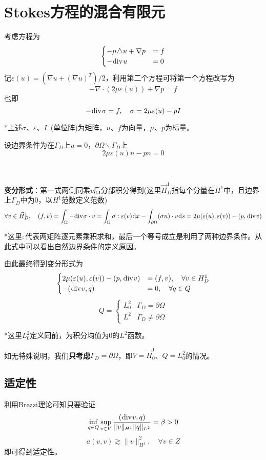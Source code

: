 \documentclass[a4paper,UTF8,fontset=windows]{ctexart}
\newcommand*{\dr}{\hspace{0.07em}\mathrm{d}}
\renewcommand*{\div}{\hspace{0.07em}\mathrm{div}\hspace{0.07em}}
\begin{document}
\section{Stokes方程的混合有限元}
考虑方程为
$$\begin{cases}-\mu\triangle u+\nabla p&=f\\-\div u&=0\end{cases}$$
记$\varepsilon(u)=(\nabla u+(\nabla u)^T)/2$，利用第二个方程可将第一个方程改写为
$$-\nabla\cdot(2\mu\varepsilon(u))+\nabla p=f$$
也即
$$-\div\sigma=f,\quad\sigma=2\mu\varepsilon(u)-pI$$

*上述$\sigma$、$\varepsilon$、$I$\ (单位阵)为矩阵，$u$、$f$为向量，$\mu$、$p$为标量。

设边界条件为在$\Gamma_D$上$u=0$，$\partial\Omega\backslash\Gamma_D$上
$$2\mu\varepsilon(u)n-pn=0$$

\

\textbf{变分形式}：第一式两侧同乘$v$后分部积分得到(这里$\vec{H}_D^1$指每个分量在$H^1$中，且边界上$\Gamma_D$中为0，以$H^1$范数定义范数)
$$\forall v\in\vec{H}_D^1,\quad(f,v)=\int_\Omega-\div\sigma\cdot v=\int_\Omega\sigma:\varepsilon(v)\dr x-\int_{\partial\Omega}(\sigma n)\cdot v\dr s=2\mu(\varepsilon(u),\varepsilon(v))-(p,\div v)$$

*这里$:$代表两矩阵逐元素乘积求和，最后一个等号成立是利用了两种边界条件。从此式中可以看出自然边界条件的定义原因。

由此最终得到变分形式为
$$\begin{cases}2\mu(\varepsilon(u),\varepsilon(v))-(p,\div v)&=(f,v),\quad\forall v\in H_D^1\\-(\div v,q)&=0,\quad\forall q\in Q\end{cases}$$
$$Q=\begin{cases}L_0^2&\Gamma_D=\partial\Omega\\L^2&\Gamma_D\ne\partial\Omega\end{cases}$$

*这里$L_0^2$定义同前，为积分均值为0的$L^2$函数。

如无特殊说明，我们\textbf{只考虑}$\Gamma_D=\partial\Omega$，即$V=\vec{H}_0^1$、$Q=L_0^2$的情况。

\subsection{适定性}
利用Brezzi理论可知只要验证
$$\inf_{q\in Q}\sup_{v\in V}\frac{(\div v,q)}{\|v\|_{H^1}\|q\|_{L^2}}=\beta>0$$
$$a(v,v)\gtrsim\|v\|_{H^1}^2,\quad\forall v\in Z$$
即可得到适定性。
\end{document}
